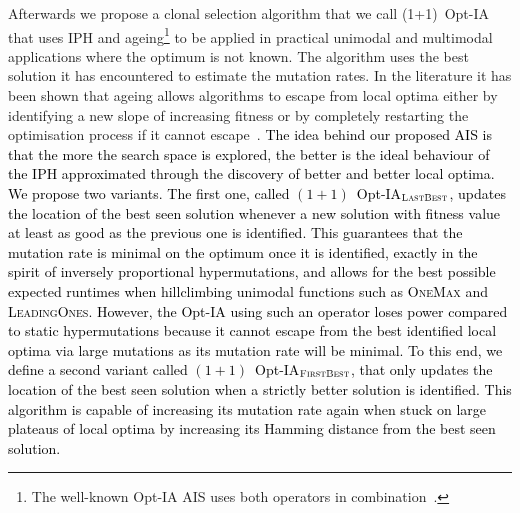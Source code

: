 \documentclass[lettersize,journal]{IEEEtran}
\newcommand{\new}[1]{\textcolor{black}{#1}}
\begin{document}
Afterwards we propose a clonal selection algorithm that we call (1+1)~Opt-IA
that uses IPH and ageing\footnote{The well-known Opt-IA AIS uses both operators in combination~\cite{CutelloNicosiaPavoneTimmis2007}.} \cite{CutelloNicosiaPavoneTimmis2007} to be applied in practical unimodal and multimodal applications where the optimum is not known. 
The algorithm uses the best solution it has encountered to estimate the mutation rates.
In the literature it has been shown that ageing allows algorithms to escape from local optima either by identifying a new slope of increasing fitness or by completely restarting the optimisation process if it cannot escape~\cite{OlivetoSudholt2014ageing,CorusOlivetoYazdaniGECCO2017,CorusOlivetoYazdaniAIJ2019,HorobaJansenZarges09,JansenZarges2011}. 
\new{The idea behind our proposed AIS is that the more the search space is explored, the better is the ideal behaviour of the IPH approximated through the discovery of better and better local optima.
We propose two variants. The first one, called $(1+1)$~Opt-IA$_{\textsc{LastBest}}$, updates the location of the best seen solution whenever a new solution with fitness value at least as good as the previous one is identified. This guarantees that the mutation rate is minimal on the optimum once it is identified, exactly in the spirit of inversely proportional hypermutations, and allows for the best possible expected runtimes when hillclimbing unimodal functions such as \textsc{OneMax} and \textsc{LeadingOnes}. However, the Opt-IA using such an operator loses power compared to static hypermutations because it cannot escape from the best identified local optima via large mutations as its mutation rate will be minimal. To this end, we define a second variant called $(1+1)$~Opt-IA$_{\textsc{FirstBest}}$, that only updates the location of the best seen solution when a strictly better solution is identified. This algorithm is capable of increasing its mutation rate again when stuck on large plateaus of local optima by increasing its Hamming distance from the best seen solution.
}
\end{document}
